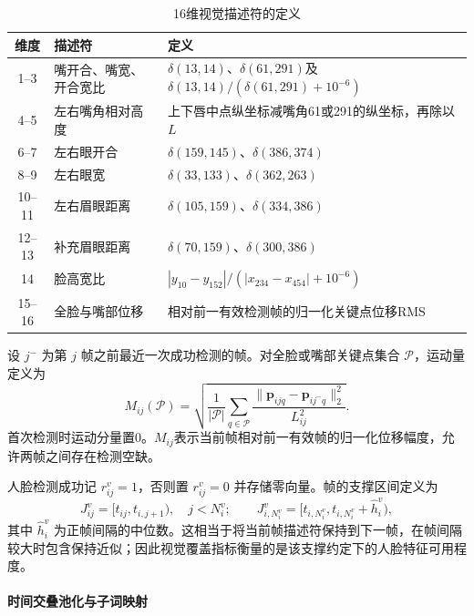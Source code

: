 \begin{table}[htbp]
\centering\small
\caption{16维视觉描述符的定义}
\label{q1:tab:vision}
\begin{tabularx}{\linewidth}{cp{3.0cm}Y}
\toprule
维度 & 描述符 & 定义 \\
--3 & 嘴开合、嘴宽、开合宽比 & $\delta(13,14)$、$\delta(61,291)$及$\delta(13,14)/(\delta(61,291)+10^{-6})$ \\
4--5 & 左右嘴角相对高度 & 上下唇中点纵坐标减嘴角61或291的纵坐标，再除以 $L$ \\
6--7 & 左右眼开合 & $\delta(159,145)$、$\delta(386,374)$ \\
8--9 & 左右眼宽 & $\delta(33,133)$、$\delta(362,263)$ \\
10--11 & 左右眉眼距离 & $\delta(105,159)$、$\delta(334,386)$ \\
12--13 & 补充眉眼距离 & $\delta(70,159)$、$\delta(300,386)$ \\
14 & 脸高宽比 & $|y_{10}-y_{152}|/(|x_{234}-x_{454}|+10^{-6})$ \\
15--16 & 全脸与嘴部位移 & 相对前一有效检测帧的归一化关键点位移RMS \\
\bottomrule
\end{tabularx}
\end{table}

设 $j^-$ 为第 $j$ 帧之前最近一次成功检测的帧。对全脸或嘴部关键点集合 $\mathcal P$，运动量定义为
\begin{equation}
M_{ij}(\mathcal P)=\sqrt{\frac{1}{|\mathcal P|}
\sum_{q\in\mathcal P}\frac{\|\bm p_{ijq}-\bm p_{ij^-q}\|_2^2}{L_{ij}^2}}.
\label{q1:eq:motion}
\end{equation}
首次检测时运动分量置0。$M_{ij}$表示当前帧相对前一有效帧的归一化位移幅度，允许两帧之间存在检测空缺。

人脸检测成功记 $r^v_{ij}=1$，否则置 $r^v_{ij}=0$ 并存储零向量。帧的支撑区间定义为
\begin{equation}
J^v_{ij}=[t_{ij},t_{i,j+1}),\quad j<N_i^v;
\qquad J^v_{i,N_i^v}=[t_{i,N_i^v},t_{i,N_i^v}+\widehat h_i^v),
\label{q1:eq:video-time}
\end{equation}
其中 $\widehat h_i^v$ 为正帧间隔的中位数。这相当于将当前帧描述符保持到下一帧，在帧间隔较大时包含保持近似；因此视觉覆盖指标衡量的是该支撑约定下的人脸特征可用程度。

\paragraph{时间交叠池化与子词映射}

